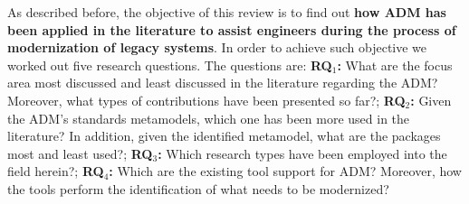 

As described before, the objective of this review is to find out \textbf{how ADM has been applied in the literature to assist engineers during the process of modernization of legacy systems}. In order to achieve such objective we worked out five research questions. The questions are: \textbf{RQ$_1$:} What are the focus area most discussed and least discussed in the literature regarding the ADM? Moreover, what types of contributions have been presented so far?; \textbf{RQ$_2$:} Given the ADM's standards metamodels, which one has been more used in the literature? In addition, given the identified metamodel, what are the packages most and least used?; \textbf{RQ$_3$:} Which research types have been employed into the field herein?; \textbf{RQ$_4$:} Which are the existing tool support for ADM? Moreover, how the tools perform the identification of what needs to be modernized?










